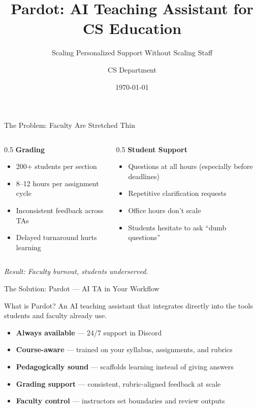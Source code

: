 \documentclass[aspectratio=169]{beamer}
\title{Pardot: AI Teaching Assistant for CS Education}
\subtitle{Scaling Personalized Support Without Scaling Staff}
\author{CS Department}
\date{\today}
\begin{document}
\begin{frame}
\titlepage
\end{frame}

\begin{frame}{The Problem: Faculty Are Stretched Thin}
\begin{columns}[T]
\begin{column}{0.5\textwidth}
\textbf{Grading}
\begin{itemize}
  \item 200+ students per section
  \item 8--12 hours per assignment cycle
  \item Inconsistent feedback across TAs
  \item Delayed turnaround hurts learning
\end{itemize}
\end{column}
\begin{column}{0.5\textwidth}
\textbf{Student Support}
\begin{itemize}
  \item Questions at all hours (especially before deadlines)
  \item Repetitive clarification requests
  \item Office hours don't scale
  \item Students hesitate to ask ``dumb questions''
\end{itemize}
\end{column}
\end{columns}
\vfill
\begin{center}
\textit{Result: Faculty burnout, students underserved.}
\end{center}
\end{frame}

\begin{frame}{The Solution: Pardot --- AI TA in Your Workflow}
\begin{block}{What is Pardot?}
An AI teaching assistant that integrates directly into the tools students and faculty already use.
\end{block}
\vspace{0.5em}
\begin{itemize}
  \item \textbf{Always available} --- 24/7 support in Discord
  \item \textbf{Course-aware} --- trained on your syllabus, assignments, and rubrics
  \item \textbf{Pedagogically sound} --- scaffolds learning instead of giving answers
  \item \textbf{Grading support} --- consistent, rubric-aligned feedback at scale
  \item \textbf{Faculty control} --- instructors set boundaries and review outputs
\end{itemize}
\end{frame}
\end{document}
